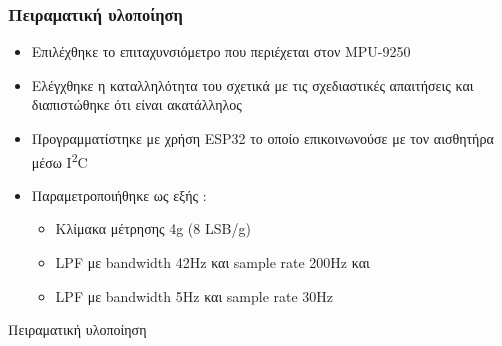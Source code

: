 \documentclass[fleqn]{beamer}
\begin{document}
\begin{frame}
  \frametitle{Πειραματική υλοποίηση}
  \begin{itemize}
      \item Επιλέχθηκε το επιταχυνσιόμετρο που περιέχεται στον ΜPU-9250
      \item Ελέγχθηκε η καταλληλότητα του σχετικά με τις σχεδιαστικές απαιτήσεις και διαπιστώθηκε ότι είναι ακατάλληλος
      \item Προγραμματίστηκε με χρήση ESP32 το οποίο επικοινωνούσε με τον αισθητήρα μέσω I\textsuperscript{2}C
      \item Παραμετροποιήθηκε ως εξής :
        \begin{itemize}
            \item Κλίμακα μέτρησης \tpm 4g (8 LSB/g)
            \item LPF με bandwidth 42Hz και sample rate 200Hz και 
            \item LPF με bandwidth 5Hz και sample rate 30Hz
        \end{itemize}
  \end{itemize}
\end{frame}

\begin{frame}{Πειραματική υλοποίηση}

\begin{figure}[H]
    \centering
\end{figure}
\end{frame}
\end{document}
